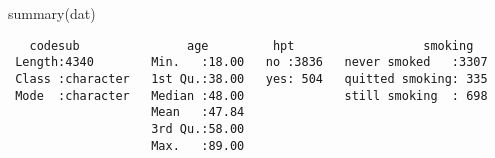 \documentclass[
  letterpaper,
  DIV=11,
  numbers=noendperiod]{scrartcl}
\newenvironment{Shaded}{\begin{snugshade}}{\end{snugshade}}
\newcommand{\FunctionTok}[1]{\textcolor[rgb]{0.28,0.35,0.67}{#1}}
\newcommand{\NormalTok}[1]{\textcolor[rgb]{0.00,0.23,0.31}{#1}}
\begin{document}
\begin{Shaded}
\begin{Highlighting}[]
\FunctionTok{summary}\NormalTok{(dat)}
\end{Highlighting}
\end{Shaded}

\begin{verbatim}
   codesub               age         hpt                  smoking    
 Length:4340        Min.   :18.00   no :3836   never smoked   :3307  
 Class :character   1st Qu.:38.00   yes: 504   quitted smoking: 335  
 Mode  :character   Median :48.00              still smoking  : 698  
                    Mean   :47.84                                    
                    3rd Qu.:58.00                                    
                    Max.   :89.00                                    
                                                                     

\end{verbatim}
\end{document}
